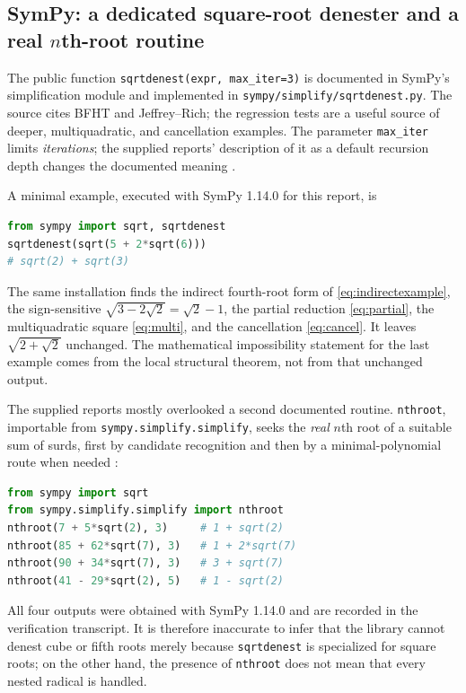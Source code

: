 \documentclass[11pt,oneside]{article}
\numberwithin{equation}{section}
\theoremstyle{definition}
\theoremstyle{remark}
\begin{document}
\subsection{SymPy: a dedicated square-root denester and a real \texorpdfstring{$n$}{n}th-root routine}
The public function \texttt{sqrtdenest(expr, max\_iter=3)} is documented in SymPy's simplification module and implemented in \texttt{sympy/simplify/sqrtdenest.py}. The source cites BFHT and Jeffrey--Rich; the regression tests are a useful source of deeper, multiquadratic, and cancellation examples. The parameter \texttt{max\_iter} limits \emph{iterations}; the supplied reports' description of it as a default recursion depth changes the documented meaning \cite{sympy,sympysource,sympytests}.

A minimal example, executed with SymPy 1.14.0 for this report, is
\begin{lstlisting}[language=Python]
from sympy import sqrt, sqrtdenest
sqrtdenest(sqrt(5 + 2*sqrt(6)))
# sqrt(2) + sqrt(3)
\end{lstlisting}
The same installation finds the indirect fourth-root form of \eqref{eq:indirectexample}, the sign-sensitive $\sqrt{3-2\sqrt2}=\sqrt2-1$, the partial reduction \eqref{eq:partial}, the multiquadratic square \eqref{eq:multi}, and the cancellation \eqref{eq:cancel}. It leaves $\sqrt{2+\sqrt2}$ unchanged. The mathematical impossibility statement for the last example comes from the local structural theorem, not from that unchanged output.

The supplied reports mostly overlooked a second documented routine. \texttt{nthroot}, importable from \texttt{sympy.simplify.simplify}, seeks the \emph{real} $n$th root of a suitable sum of surds, first by candidate recognition and then by a minimal-polynomial route when needed \cite{sympy}:
\begin{lstlisting}[language=Python]
from sympy import sqrt
from sympy.simplify.simplify import nthroot
nthroot(7 + 5*sqrt(2), 3)     # 1 + sqrt(2)
nthroot(85 + 62*sqrt(7), 3)   # 1 + 2*sqrt(7)
nthroot(90 + 34*sqrt(7), 3)   # 3 + sqrt(7)
nthroot(41 - 29*sqrt(2), 5)   # 1 - sqrt(2)
\end{lstlisting}
All four outputs were obtained with SymPy 1.14.0 and are recorded in the verification transcript. It is therefore inaccurate to infer that the library cannot denest cube or fifth roots merely because \texttt{sqrtdenest} is specialized for square roots; on the other hand, the presence of \texttt{nthroot} does not mean that every nested radical is handled.
\end{document}
